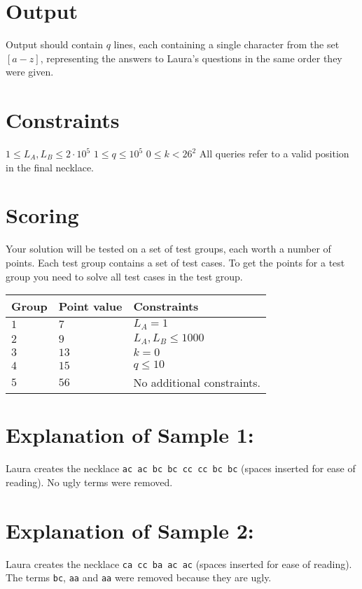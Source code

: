 \section*{Output}
Output should contain $q$ lines, each containing a single character from the set $[a-z]$, representing the answers to Laura's questions in the same order they were given.

\section*{Constraints}
$1 \le L_A, L_B \le 2\cdot 10^5$
\newline
$1 \le q \le  10^5$
\newline
$0 \le k < 26^2$
\newline
All queries refer to a valid position in the final necklace.

\section*{Scoring}
Your solution will be tested on a set of test groups, each worth a number of points. 
Each test group contains a set of test cases. 
To get the points for a test group you need to solve all test cases in the test group.

\noindent
\begin{tabular}{| l | l | p{12cm} |}
  \hline
  \textbf{Group} & \textbf{Point value} & \textbf{Constraints} \\ \hline
  $1$    & $7$        & $L_A = 1$  \\ \hline
  $2$    & $9$        & $L_A, L_B \le 1000$ \\ \hline
  $3$    & $13$       & $k = 0$ \\ \hline
  $4$    & $15$       & $q \le 10$ \\ \hline 
  $5$    & $56$       & No additional constraints. \\ \hline
\end{tabular}

\section*{Explanation of Sample 1:}
Laura creates the necklace \texttt{ac ac bc bc cc cc bc bc} (spaces inserted for ease of reading).
No ugly terms were removed.

\section*{Explanation of Sample 2:}
Laura creates the necklace \texttt{ca cc ba ac ac} (spaces inserted for ease of reading).
The terms \texttt{bc}, \texttt{aa} and \texttt{aa} were removed because they are ugly.
